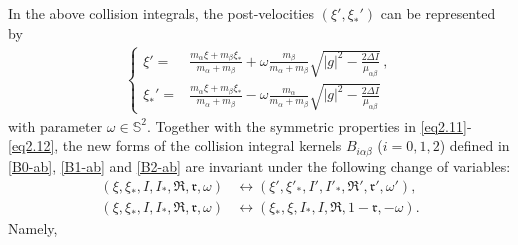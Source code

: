 \documentclass[reqno,11pt]{amsart}
\numberwithin{equation}{section}
\begin{document}
In the above collision integrals, the post-velocities $(\xi', \xi_*')$ can be represented by
\begin{equation}
    \begin{aligned}
        \left\{
             \begin{aligned}
                 \xi ' = & \tfrac{m_\alpha \xi +m_\beta \xi_* }{m_\alpha + m_\beta } + \omega \tfrac{m_\beta  }{m_\alpha + m_\beta } \sqrt{|g|^2 -\tfrac{2 \Delta I}{\mu_{\alpha \beta }}} \,, \\
                 \xi_* ' = & \tfrac{m_\alpha \xi +m_\beta \xi_* }{m_\alpha + m_\beta } - \omega \tfrac{m_\alpha }{m_\alpha + m_\beta } \sqrt{|g|^2 -\tfrac{2 \Delta I}{\mu_{\alpha \beta }}}
             \end{aligned}
        \right.
    \end{aligned}
\end{equation}
with parameter $\omega \in \mathbb{S}^2$. Together with the symmetric properties in \eqref{eq2.11}-\eqref{eq2.12}, the new forms of the collision integral kernels $B_{i \alpha \beta }$ ($i=0,1,2$) defined in \eqref{B0-ab}, \eqref{B1-ab} and \eqref{B2-ab} are invariant under the following change of variables:
\begin{equation}\label{eq2.18}
	\begin{aligned}
		(\xi , \xi_* , I , I_*, \mathfrak{R}, \mathfrak{r} , \omega ) &\leftrightarrow (\xi' , \xi'_* , I' , I'_*, \mathfrak{R}', \mathfrak{r}' , \omega' ),\\
		(\xi , \xi_* , I , I_*, \mathfrak{R}, \mathfrak{r} , \omega ) &\leftrightarrow (\xi_* , \xi , I_* , I, \mathfrak{R}, 1-\mathfrak{r} , -\omega ).
	\end{aligned}
\end{equation}
Namely, 
\end{document}
